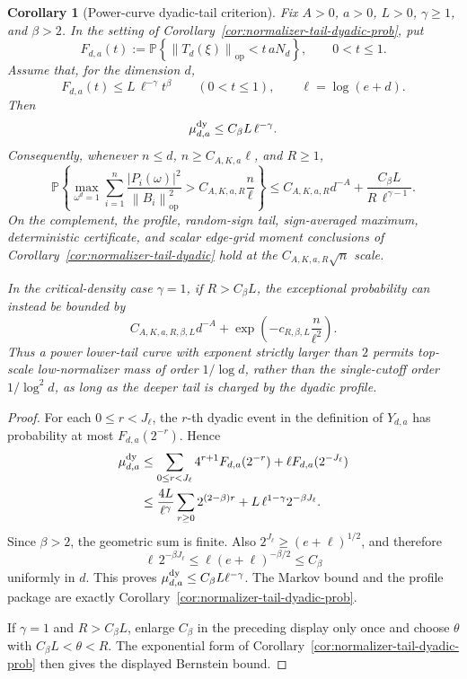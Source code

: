 \documentclass[11pt]{amsart}
\numberwithin{equation}{section}
\newtheorem{corollary}[theorem]{Corollary}
\theoremstyle{definition}
\theoremstyle{remark}
\newcommand{\op}{\mathrm{op}}
\newcommand{\Prob}{\mathbb P}
\newcommand{\norm}[1]{\left\lVert #1\right\rVert}
\newcommand{\abs}[1]{\left\lvert #1\right\rvert}
\begin{document}
\begin{corollary}[Power-curve dyadic-tail criterion]
\label{cor:normalizer-tail-power-curve}
Fix \(A>0\), \(a>0\), \(L>0\), \(\gamma\ge1\), and \(\beta>2\).  In the
setting of Corollary~\ref{cor:normalizer-tail-dyadic-prob}, put
\[
  F_{d,a}(t):=
  \Prob\left\{\norm{T_d(\xi)}_{\op}<t\,aN_d\right\},
  \qquad 0<t\le1 .
\]
Assume that, for the dimension \(d\),
\[
  F_{d,a}(t)\le L\,\ell^{-\gamma}t^\beta
  \qquad(0<t\le1),
  \qquad \ell=\log(e+d).
\]
Then
\[
  \mu_{d,a}^{\rm dy}\le C_\beta L\,\ell^{-\gamma}.
\]
Consequently, whenever \(n\le d\), \(n\ge C_{A,K,a}\ell\), and \(R\ge1\),
\[
  \Prob\left\{
  \max_{\omega^d=1}
  \sum_{i=1}^n
  \frac{\abs{P_i(\omega)}^2}{\norm{B_i}_{\op}^2}
  > C_{A,K,a,R}\frac n\ell
  \right\}
  \le
  C_{A,K,a,R}d^{-A}
  +\frac{C_\beta L}{R\,\ell^{\gamma-1}} .
\]
On the complement, the profile, random-sign tail, sign-averaged maximum,
deterministic certificate, and scalar edge-grid moment conclusions of
Corollary~\ref{cor:normalizer-tail-dyadic} hold at the
\(C_{A,K,a,R}\sqrt n\) scale.

In the critical-density case \(\gamma=1\), if \(R>C_\beta L\), the exceptional
probability can instead be bounded by
\[
  C_{A,K,a,R,\beta,L}d^{-A}
  +\exp\left(-c_{R,\beta,L}\frac n{\ell^2}\right).
\]
Thus a power lower-tail curve with exponent strictly larger than \(2\) permits
top-scale low-normalizer mass of order \(1/\log d\), rather than the
single-cutoff order \(1/\log^2 d\), as long as the deeper tail is charged by
the dyadic profile.
\end{corollary}

\begin{proof}
For each \(0\le r<J_\ell\), the \(r\)-th dyadic event in the definition of
\(Y_{d,a}\) has probability at most \(F_{d,a}(2^{-r})\).  Hence
\[
\begin{aligned}
  \mu_{d,a}^{\rm dy}
  &\le
  \sum_{0\le r<J_\ell}4^{r+1}F_{d,a}(2^{-r})
  +\ell F_{d,a}(2^{-J_\ell})  \\
  &\le
  \frac{4L}{\ell^\gamma}
  \sum_{r\ge0}2^{(2-\beta)r}
  +L\,\ell^{1-\gamma}2^{-\beta J_\ell}.
\end{aligned}
\]
Since \(\beta>2\), the geometric sum is finite.  Also
\(2^{J_\ell}\ge(e+\ell)^{1/2}\), and therefore
\[
  \ell\,2^{-\beta J_\ell}
  \le \ell(e+\ell)^{-\beta/2}
  \le C_\beta
\]
uniformly in \(d\).  This proves
\(\mu_{d,a}^{\rm dy}\le C_\beta L\ell^{-\gamma}\).
The Markov bound and the profile package are exactly
Corollary~\ref{cor:normalizer-tail-dyadic-prob}.

If \(\gamma=1\) and \(R>C_\beta L\), enlarge \(C_\beta\) in the preceding
display only once and choose \(\theta\) with
\(C_\beta L<\theta<R\).  The exponential form of
Corollary~\ref{cor:normalizer-tail-dyadic-prob} then gives the displayed
Bernstein bound.
\end{proof}
\end{document}
